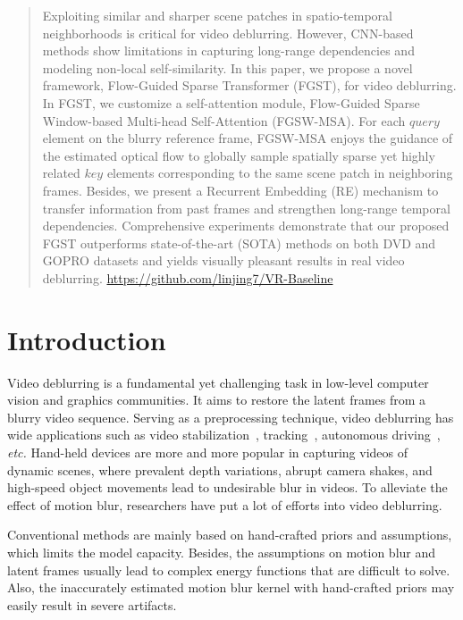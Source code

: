 \documentclass{article}
\begin{document}
	
	\begin{abstract}
		\vspace{-1mm}
		Exploiting similar and sharper scene patches in spatio-temporal neighborhoods is critical for video deblurring. However, CNN-based methods show limitations in capturing long-range dependencies and modeling non-local self-similarity. In this paper, we propose a novel framework, Flow-Guided Sparse Transformer (FGST), for video deblurring. In FGST, we customize a self-attention module, Flow-Guided Sparse Window-based Multi-head Self-Attention (FGSW-MSA). For each $query$ element on the blurry reference frame, FGSW-MSA enjoys the guidance of the estimated optical flow to globally sample spatially sparse yet highly related $key$ elements corresponding to the same scene patch in neighboring frames. Besides, we present a Recurrent Embedding (RE) mechanism to transfer information from past frames and strengthen long-range temporal dependencies. Comprehensive experiments demonstrate that our proposed FGST outperforms state-of-the-art (SOTA) methods on both DVD and GOPRO datasets and yields visually pleasant results in real video deblurring.  \url{https://github.com/linjing7/VR-Baseline}
	\end{abstract}
	
	\vspace{-4mm}
	\section{Introduction}
	\vspace{-1mm}
	\label{introduction}
	
	Video deblurring is a fundamental yet challenging task in low-level computer vision and graphics communities. It aims to restore the latent frames from a blurry video sequence. Serving as a preprocessing technique, video deblurring has wide applications such as video stabilization~\cite{matsushita2006full}, tracking~\cite{track}, autonomous driving~\cite{3d_det}, \emph{etc.}  Hand-held devices are more and more popular in capturing videos of dynamic scenes, where prevalent depth variations, abrupt camera shakes, and high-speed object movements lead to undesirable blur in videos. To alleviate the effect of motion blur, researchers have put a lot of efforts into video deblurring.  
	
	Conventional methods are mainly based on hand-crafted priors and assumptions, which limits the model capacity. Besides, the assumptions on motion blur and latent frames usually lead to complex energy functions that are difficult to solve. Also, the inaccurately estimated motion blur kernel with hand-crafted priors may easily result in severe artifacts.
	
\end{document}

